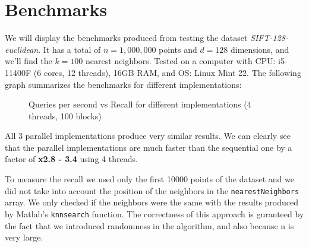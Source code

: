\documentclass{article}
\begin{document}
\section{Benchmarks}
We will display the benchmarks produced from testing the dataset \emph{SIFT-128-euclidean}.
It has a total of $n=1,000,000$ points and $d=128$ dimensions, and we'll find the $k=100$ nearest neighbors.
Tested on a computer with CPU: i5-11400F (6 cores, 12 threads), 16GB RAM, and OS: Linux Mint 22.
The following graph summarizes the benchmarks for different implementations:

\begin{figure}[H]
\centering
{}
\caption{Queries per second vs Recall for different implementations (4 threads, 100 blocks)}
\end{figure}

All 3 parallel implementations produce very similar results. 
We can clearly see that the parallel implementations are much faster than the sequential one
by a factor of \textbf{x2.8 - 3.4} using 4 threads.

To measure the recall we used only the first 10000 points of the dataset and we did not take into account
the position of the neighbors in the \texttt{nearestNeighbors} array. We only checked if the neighbors were the same
with the results produced by Matlab's \texttt{knnsearch} function. The correctness of this approach is guranteed
by the fact that we introduced randomness in the algorithm, and also because n is very large.
\end{document}

